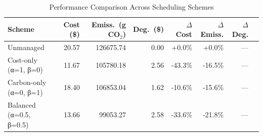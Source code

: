 \begin{table}[H]
\centering
\caption{Performance Comparison Across Scheduling Schemes}
\label{tab:performance}
\begin{tabular}{lrrrrrrr}
\toprule
Scheme & Cost (\$) & Emiss.\ (g CO$_2$) & Deg.\ (\$) & $\Delta$Cost & $\Delta$Emiss. & $\Delta$Deg. \\
\midrule
Unmanaged & 20.57 & 126675.74 & 0.00 & +0.0\% & +0.0\% & — \\
Cost-only (α=1, β=0) & 11.67 & 105780.18 & 2.56 & -43.3\% & -16.5\% & — \\
Carbon-only (α=0, β=1) & 18.40 & 106853.04 & 1.62 & -10.6\% & -15.6\% & — \\
Balanced (α=0.5, β=0.5) & 13.66 & 99053.27 & 2.58 & -33.6\% & -21.8\% & — \\
\bottomrule
\end{tabular}
\end{table}